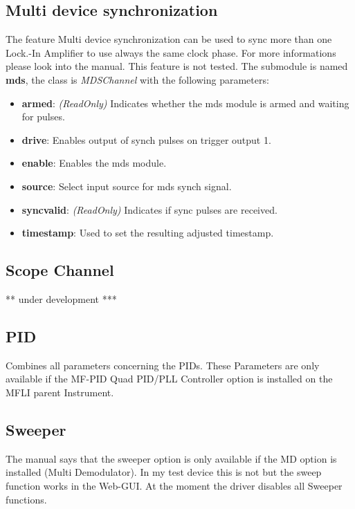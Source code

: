 \documentclass[11pt]{article} %
\begin{document}
\subsection{Multi device synchronization}
The feature Multi device synchronization can be used to sync more than one Lock.-In Amplifier to use always the same clock phase. For more informations please look into the manual. This feature is not tested. The submodule is named {\bf mds}, the class is {\it MDSChannel} with the following parameters:
\begin{itemize}
\item {\bf armed}: {\it (ReadOnly)} Indicates whether the mds module is armed and waiting for pulses.
\item {\bf drive}: Enables output of synch pulses on trigger output 1.
\item {\bf enable}: Enables the mds module.
\item {\bf source}: Select input source for mds synch signal.
\item {\bf syncvalid}: {\it (ReadOnly)} Indicates if sync pulses are received.
\item {\bf timestamp}: Used to set the resulting adjusted timestamp.
\end{itemize}


\subsection{Scope Channel}
        ** under development ***


\subsection{PID}
    Combines all parameters concerning the PIDs.
    These Parameters are only available if the MF-PID Quad PID/PLL Controller 
    option is installed on the MFLI parent Instrument.


\subsection{Sweeper}
The manual says that the sweeper option is only available if the MD option is installed (Multi Demodulator). In my test device this is not but the sweep function works in the Web-GUI. At the moment the driver disables all Sweeper functions.
\end{document}
